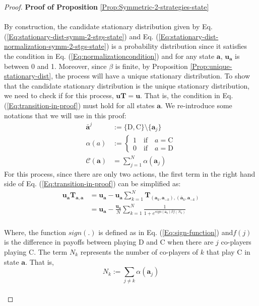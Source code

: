 \documentclass[11pt]{article}
\theoremstyle{plainCl1}
\theoremstyle{plainCl2}
\newcommand{\abf}{\mathbf{a}}
\newcommand{\T}{\mathbf{T}}
\newcommand{\ubf}{\mathbf{u}}
\newcommand{\C}{\mathrm{C}}
\newcommand{\D}{\mathrm{D}}
\begin{document}
\begin{proof}
\textbf{Proof of Proposition} \ref{Prop:Symmetric-2-strategies-state} \\ \\
By construction, the candidate stationary distribution given by Eq. (\ref{Eq:stationary-dist-symm-2-stgs-state}) and Eq. (\ref{Eq:stationary-dist-normalization-symm-2-stgs-state}) is a probability distribution since it satisfies the condition in Eq. (\ref{Eq:normalizationcondition}) and for any state $\abf$, $\ubf_{\abf}$ is between 0 and 1.  Moreover, since $\beta$ is finite, by Proposition \ref{Prop:unique-stationary-dist}, the process will have a unique stationary distribution. To show that the candidate stationary distribution is the unique stationary distribution, we need to check if for this process, $\ubf \T= \ubf$. That is, the condition in Eq. (\ref{Eq:transition-in-proof}) must hold for all states $\abf$. We re-introduce some notations that we will use in this proof: 
\begin{align}
\bar{\abf}^j &:= \{\D,\C\} \setminus \{\abf_j\} \\[10pt]
\alpha(a)&:= 
\begin{cases}
1 \quad \text{if} \quad a = \C \\[10pt]
0 \quad \text{if} \quad a = \D 
\end{cases}\\[10pt]
\mathcal{C}(\abf) &= \sum_{j=1}^N \alpha(\abf_j)
\end{align}
For this process, since there are only two actions, the first term in the right hand side of Eq. (\ref{Eq:transition-in-proof}) can be simplified as: 
\begin{align}
\ubf_{\abf} \T_{\abf,\abf}  &= \ubf_\abf - \ubf_{\abf} \sum_{k=1}^{N} \T_{(\abf_k, \abf_{-k}),(\bar{\abf}_{k}, \abf_{-k})} \\[10pt]
&= \ubf_{\abf} - \frac{\ubf_{\abf}}{N} \sum_{k=1}^N \frac{1}{1 + \displaystyle e^{\mathit{sign}(\bar{\abf}_{k}) \beta f(N_k)}}
\label{Eq:T_aa_u_a term}
\end{align}
\\ \noindent Where, the function $\mathit{sign}(.)$ is  defined as in Eq. (\ref{Eq:sign-function}) and$f(j)$ is the difference in payoffs between playing $\D$ and $\C$ when there are $j$ co-players playing $\C$. The term $N_k$ represents the number of co-players of $k$ that play $\C$ in state $\abf$. That is,
\begin{equation}
N_k := \sum_{j \neq k} \alpha(\abf_j)
\end{equation} \\

\end{proof}
\end{document}

